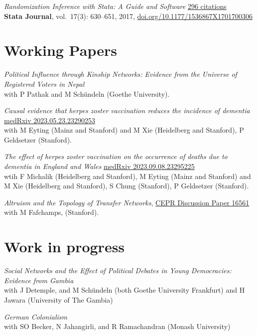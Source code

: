 \documentclass[
  a4paper, 10pt]{article}
\begin{document}
\emph{Randomization Inference with Stata: A Guide and Software}
\href{https://scholar.google.de/citations?user=E_zs3XIAAAAJ}{296
citations} \\
\textbf{Stata Journal}, vol.~17(3): 630--651, 2017,
\href{https://doi.org/10.1177/1536867X1701700306}{doi.org/10.1177/1536867X1701700306}

\hypertarget{working-papers}{%
\section{Working Papers}\label{working-papers}}

\emph{Political Influence through Kinship Networks: Evidence from the
Universe of Registered Voters in Nepal}\\
with P Pathak and M Schündeln (Goethe University).

\emph{Causal evidence that herpes zoster vaccination reduces the
incidence of dementia}
\href{https://doi.org/10.1101/2023.05.23.23290253}{medRxiv
2023.05.23.23290253}\\
with M Eyting (Mainz and Stanford) and M Xie (Heidelberg and Stanford),
P Geldsetzer (Stanford).

\emph{The effect of herpes zoster vaccination on the occurrence of
deaths due to dementia in England and Wales}
\href{https://doi.org/10.1101/2023.09.08.23295225}{medRxiv
2023.09.08.23295225}\\
wtih F Michalik (Heidelberg and Stanford), M Eyting (Mainz and Stanford)
and M Xie (Heidelberg and Stanford), S Chung (Stanford), P Geldsetzer
(Stanford).

\emph{Altruism and the Topology of Transfer Networks},
\href{https://hesss.org/Gambia_Topology.pdf}{CEPR Discussion Paper
16561}\\
with M Fafchamps, (Stanford).

\hypertarget{work-in-progress}{%
\section{Work in progress}\label{work-in-progress}}

\emph{Social Networks and the Effect of Political Debates in Young
Democracies: Evidence from Gambia}\\
with J Detemple, and M Schündeln (both Goethe University Frankfurt) and
H Jawara (University of The Gambia)

\emph{German Colonialism}\\
with SO Becker, N Jahangirli, and R Ramachandran (Monash University)
\end{document}
